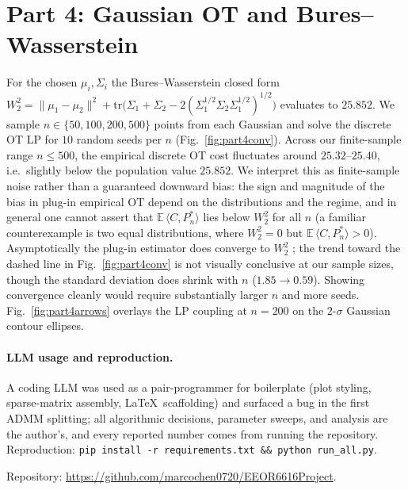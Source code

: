\documentclass{article}
\begin{document}
\section{Part 4: Gaussian OT and Bures--Wasserstein}
\label{sec:part4}

For the chosen $\mu_i,\Sigma_i$ the Bures--Wasserstein closed form
$W_2^2 = \|\mu_1-\mu_2\|^2 + \mathrm{tr}\bigl(\Sigma_1+\Sigma_2 -
2(\Sigma_1^{1/2}\Sigma_2\Sigma_1^{1/2})^{1/2}\bigr)$ evaluates to
$25.852$.  We sample $n\!\in\!\{50,100,200,500\}$ points from each
Gaussian and solve the discrete OT LP for $10$ random seeds per $n$
(Fig.~\ref{fig:part4conv}).  Across our finite-sample range
$n\!\le\!500$, the empirical discrete OT cost fluctuates around
$25.32$--$25.40$, i.e.\ slightly below the population value $25.852$.
We interpret this as finite-sample noise rather than a guaranteed
downward bias: the sign and magnitude of the bias in plug-in
empirical OT depend on the distributions and the regime, and in general
one cannot assert that $\mathbb E\,\langle C, P_n^*\rangle$ lies below
$W_2^2$ for all $n$ (a familiar counterexample is two equal
distributions, where $W_2^2\!=\!0$ but $\mathbb E\,\langle C, P_n^*\rangle\!>\!0$).
Asymptotically the plug-in estimator does converge to $W_2^2$
\cite{peyre2019computational}; the trend toward the dashed line in
Fig.~\ref{fig:part4conv} is not visually conclusive at our sample sizes,
though the standard deviation does shrink with $n$ ($1.85\!\to\!0.59$).
Showing convergence cleanly would require substantially larger $n$ and
more seeds.  Fig.~\ref{fig:part4arrows} overlays the LP coupling at
$n\!=\!200$ on the $2$-$\sigma$ Gaussian contour ellipses.

\paragraph{LLM usage and reproduction.}
A coding LLM was used as a pair-programmer for boilerplate (plot
styling, sparse-matrix assembly, \LaTeX\ scaffolding) and surfaced a
bug in the first ADMM splitting; all algorithmic decisions, parameter
sweeps, and analysis are the author's, and every reported number comes
from running the repository.  Reproduction:
\texttt{pip install -r requirements.txt \&\& python run\_all.py}.
\par\smallskip\noindent
Repository: \url{https://github.com/marcochen0720/EEOR6616Project}.

\clearpage
\begingroup
\setlength{\bibsep}{2pt plus 0.3ex}


\endgroup
\end{document}
